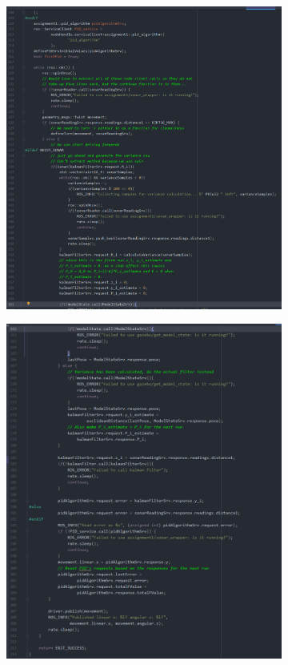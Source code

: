 \documentclass{article}
\begin{document}
\begin{figure}[ht]
    \begin{subfigure}{.5\textwidth}
        \centering
        \includegraphics[scale=0.24]{img/controller3.png}
    \end{subfigure}
    \begin{subfigure}{.5\textwidth}
        \centering
        \includegraphics[scale=0.24]{img/controller4.png}

\end{subfigure}
\end{figure}
\end{document}

